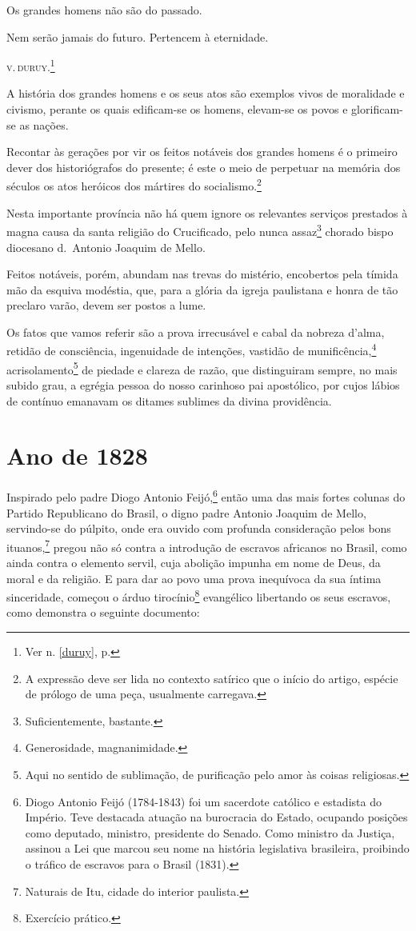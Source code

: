 Os grandes homens não são do passado.

Nem serão jamais do futuro. Pertencem à eternidade.

\textsc{v.\,duruy}.\footnote{Ver n. \ref{duruy}, p. \pageref{duruy}}

A história dos grandes homens e os seus atos são exemplos vivos de
moralidade e civismo, perante os quais edificam-se os homens, elevam-se
os povos e glorificam-se as nações.

Recontar às gerações por vir os feitos notáveis dos grandes homens é o
primeiro dever dos historiógrafos do presente; é este o meio de
perpetuar na memória dos séculos os atos heróicos dos mártires do
socialismo.\footnote{A expressão deve ser lida no contexto satírico
  que o início do artigo, espécie de prólogo de uma peça, usualmente
  carregava.}

Nesta importante província não há quem ignore os relevantes serviços
prestados à magna causa da santa religião do Crucificado, pelo nunca
assaz\footnote{Suficientemente, bastante.} chorado bispo diocesano
d.~Antonio Joaquim de Mello.

Feitos notáveis, porém, abundam nas trevas do mistério, encobertos pela
tímida mão da esquiva modéstia, que, para a glória da igreja paulistana
e honra de tão preclaro varão, devem ser postos a lume.

Os fatos que vamos referir são a prova irrecusável e cabal da nobreza
d'alma, retidão de consciência, ingenuidade de intenções, vastidão de
munificência,\footnote{Generosidade, magnanimidade.}
acrisolamento\footnote{Aqui no sentido de sublimação, de purificação
  pelo amor às coisas religiosas.} de piedade e clareza de razão, que
distinguiram sempre, no mais subido grau, a egrégia pessoa do nosso
carinhoso pai apostólico, por cujos lábios de contínuo emanavam os
ditames sublimes da divina providência.

\section{Ano de 1828}

Inspirado pelo padre Diogo Antonio Feijó,\footnote{Diogo Antonio Feijó
  (1784-1843) foi um sacerdote católico e estadista do Império. Teve
  destacada atuação na burocracia do Estado, ocupando posições como
  deputado, ministro, presidente do Senado. Como ministro da Justiça,
  assinou a Lei que marcou seu nome na história legislativa brasileira,
  proibindo o tráfico de escravos para o Brasil (1831).} então uma das
mais fortes colunas do Partido Republicano do Brasil, o digno padre
Antonio Joaquim de Mello, servindo-se do púlpito, onde era ouvido com
profunda consideração pelos bons ituanos,\footnote{Naturais de Itu,
  cidade do interior paulista.} pregou não só contra a introdução de
escravos africanos no Brasil, como ainda contra o elemento servil, cuja
abolição impunha em nome de Deus, da moral e da religião. E para dar ao
povo uma prova inequívoca da sua íntima sinceridade, começou o árduo
tirocínio\footnote{Exercício prático.} evangélico libertando os seus
escravos, como demonstra o seguinte documento:


